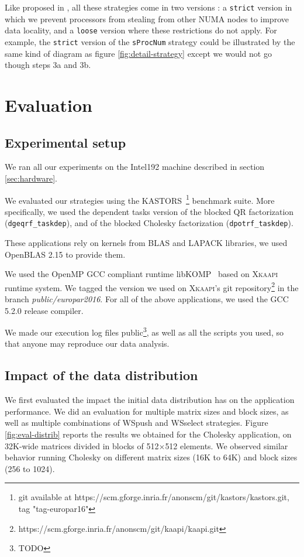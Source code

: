 \documentclass{Styles/llncs}
\newcommand{\kaapi}{\textsc{\mbox{Xkaapi}}\xspace}
\begin{document}
Like proposed in \cite{Olivier:2012:CMW:2388996.2389085}, all these strategies come in two versions : a \verb!strict! version in which we prevent processors from stealing from other NUMA nodes to improve data locality, and a \verb!loose! version where these restrictions do not apply.
For example, the \verb!strict! version of the \verb!sProcNum! strategy could be illustrated by the same kind of diagram as figure \ref{fig:detail-strategy} except we would not go though steps 3a and 3b.

\section{Evaluation}

\subsection{Experimental setup}

We ran all our experiments on the Intel192 machine described in section \ref{sec:hardware}.

We evaluated our strategies using the KASTORS~\cite{virouleau:hal-01081974}\footnote{git available at https://scm.gforge.inria.fr/anonscm/git/kastors/kastors.git, tag "tag-europar16"} benchmark suite.
More specifically, we used the dependent tasks version of the blocked QR factorization
(\verb/dgeqrf_taskdep/), and of the blocked Cholesky factorization (\verb/dpotrf_taskdep/).

These applications rely on kernels from BLAS and LAPACK libraries, we used OpenBLAS 2.15
to provide them.

We used the OpenMP GCC compliant runtime libKOMP~\cite{libkomp} based on \kaapi runtime system. We tagged the version we used on \kaapi's
git repository\footnote{https://scm.gforge.inria.fr/anonscm/git/kaapi/kaapi.git } in the branch \emph{public/europar2016}.
For all of the above applications, we used the GCC 5.2.0 release compiler.

We made our execution log files public\footnote{TODO}, as well as all the scripts you used, so that
anyone may reproduce our data analysis.

\subsection{Impact of the data distribution}

We first evaluated the impact the initial data distribution has on the application performance. We did an evaluation for multiple matrix sizes and block sizes,
as well as multiple combinations of WSpush and WSselect strategies. Figure \ref{fig:eval-distrib} reports the
results we obtained for the Cholesky application, on 32K-wide matrices divided in blocks of 512$\times$512 elements. We observed similar behavior running Cholesky on different matrix sizes (16K to 64K) and block sizes (256 to 1024).
\end{document}
